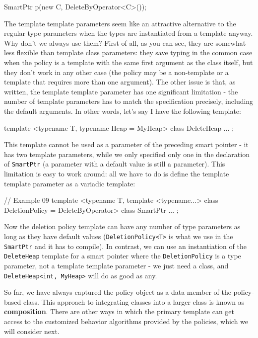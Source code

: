 \begin{code}
SmartPtr p(new C, DeleteByOperator<C>());
\end{code}

The template template parameters seem like an attractive alternative to the regular type parameters when the types are instantiated from a template anyway. Why don't we always use them? First of all, as you can see, they are somewhat less flexible than template class parameters: they save typing in the common case when the policy is a template with the same first argument as the class itself, but they don't work in any other case (the policy may be a non-template or a template that requires more than one argument). The other issue is that, as written, the template template parameter has one significant limitation - the number of template parameters has to match the specification precisely, including the default arguments. In other words, let's say I have the following template:

\begin{code}
template <typename T, typename Heap = MyHeap> class DeleteHeap { ... };
\end{code}

This template cannot be used as a parameter of the preceding smart pointer - it has two template parameters, while we only specified only one in the declaration of \texttt{SmartPtr} (a parameter with a default value is still a parameter). This limitation is easy to work around: all we have to do is define the template template parameter as a variadic template:

\begin{code}
// Example 09
template <typename T,
          template <typename...> class DeletionPolicy =
                                    DeleteByOperator>
class SmartPtr {
  ...
};
\end{code}

Now the deletion policy template can have any number of type parameters as long as they have default values (\texttt{DeletionPolicy\textless{}T\textgreater{}} is what we use in the \texttt{SmartPtr} and it has to compile). In contrast, we can use an instantiation of the \texttt{DeleteHeap} template for a smart pointer where the \texttt{DeletionPolicy} is a type parameter, not a template template parameter - we just need a class, and \texttt{DeleteHeap\textless{}int,\ MyHeap\textgreater{}} will do as good as any.

So far, we have always captured the policy object as a data member of the policy-based class. This approach to integrating classes into a larger class is known as \textbf{composition}. There are other ways in which the primary template can get access to the customized behavior algorithms provided by the policies, which we will consider next.

